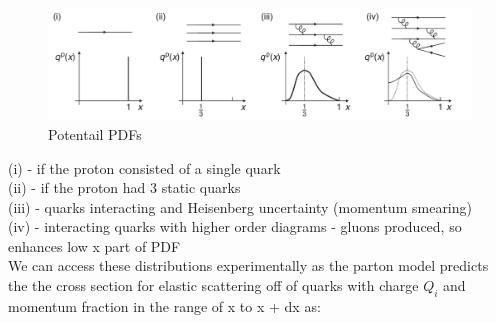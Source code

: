         \begin{figure}[H]
            \centering
            \includegraphics[width=12cm]{Chapters/Ch1-Intro/Ch1-Sec1-Background/pics/inelastic-ep/pdf-possibilities.PNG}
            \caption{Potentail PDFs}
        \end{figure}
        
        (i) - if the proton consisted of a single quark\\
        (ii) - if the proton had 3 static quarks\\
        (iii) - quarks interacting and Heisenberg uncertainty (momentum smearing)\\
        (iv) - interacting quarks with higher order diagrams - gluons produced, so enhances low x part of PDF\\
        \newline
        We can access these distributions experimentally as the parton model predicts the the cross section for elastic scattering off of quarks with charge $Q_i$ and momentum fraction in the range of x to x + dx as:
        \fi